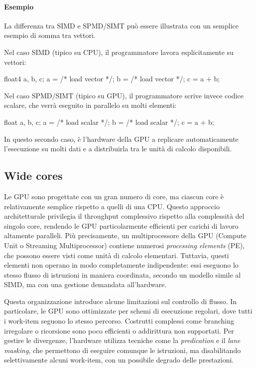 \paragraph{Esempio}
La differenza tra SIMD e SPMD/SIMT può essere illustrata con un semplice esempio di somma tra vettori.

Nel caso SIMD (tipico su CPU), il programmatore lavora esplicitamente su vettori:
\begin{code}
float4 a, b, c;
a = /* load vector */;
b = /* load vector */;
c = a + b;
\end{code}

Nel caso SPMD/SIMT (tipico su GPU), il programmatore scrive invece codice scalare, che verrà eseguito in parallelo su molti elementi:
\begin{code}
float a, b, c;
a = /* load scalar */;
b = /* load scalar */;
c = a + b;
\end{code}

In questo secondo caso, è l'hardware della GPU a replicare automaticamente l'esecuzione su molti dati e a distribuirla tra le unità di calcolo disponibili.

\subsection{Wide cores}
Le GPU sono progettate con un gran numero di core, ma ciascun core è relativamente semplice rispetto a quelli di una CPU. Questo approccio architetturale privilegia il throughput complessivo rispetto alla complessità del singolo core, rendendo le GPU particolarmente efficienti per carichi di lavoro altamente paralleli. Più precisamente, un multiprocessore della GPU (Compute Unit o Streaming Multiprocessor) contiene numerosi \emph{processing elements} (PE), che possono essere visti come unità di calcolo elementari. Tuttavia, questi elementi non operano in modo completamente indipendente: essi eseguono lo stesso flusso di istruzioni in maniera coordinata, secondo un modello simile al SIMD, ma con una gestione demandata all'hardware.

Questa organizzazione introduce alcune limitazioni sul controllo di flusso. In particolare, le GPU sono ottimizzate per schemi di esecuzione regolari, dove tutti i work-item seguono lo stesso percorso. Costrutti complessi come branching irregolare o ricorsione sono poco efficienti o addirittura non supportati. Per gestire le divergenze, l'hardware utilizza tecniche come la \emph{predication} e il \emph{lane masking}, che permettono di eseguire comunque le istruzioni, ma disabilitando selettivamente alcuni work-item, con un possibile degrado delle prestazioni.

